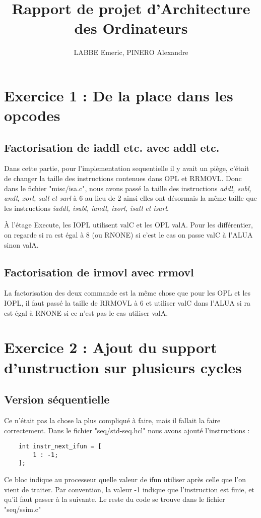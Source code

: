 \documentclass[12pt]{article}
\author{LABBE Emeric, PINERO Alexandre}
\title{Rapport de projet d'Architecture des Ordinateurs}
\begin{document}
\maketitle
\tableofcontents

\newpage
\section{Exercice 1 : De la place dans les opcodes}
\subsection{Factorisation de iaddl etc. avec addl etc.}
Dans cette partie, pour l'implementation sequentielle il y avait un piège, c'était de changer la taille des instructions contenues dans OPL et RRMOVL. Donc dans le fichier "misc/isa.c", nous avons passé la taille des instructions \emph{addl, subl, andl, xorl, sall et sarl} à 6 au lieu de 2 ainsi elles ont désormais la même taille que les instructions \emph{iaddl, isubl, iandl, ixorl, isall et isarl}.\par
\`A l'étage Execute, les IOPL utilisent valC et les OPL valA. Pour les différentier, on regarde si ra est égal à 8 (ou RNONE) si c'est le cas on passe valC à l'ALUA sinon valA.

\subsection{Factorisation de irmovl avec rrmovl}
La factorisation des deux commande est la même chose que pour les OPL et les IOPL, il faut passé la taille de RRMOVL à 6 et utiliser valC dans l'ALUA si ra est égal à RNONE si ce n'est pas le cas utiliser valA.

\section{Exercice 2 : Ajout du support d'unstruction sur plusieurs cycles}
\subsection{Version séquentielle}
Ce n'était pas la chose la plus compliqué à faire, mais il fallait la faire correctement. Dans le fichier "seq/std-seq.hcl" nous avons ajouté l'instructions :
\begin{verbatim}
	int instr_next_ifun = [
		1 : -1;
	];
\end{verbatim}
Ce bloc indique au processeur quelle valeur de ifun utiliser après celle que l’on vient de traiter.
Par convention, la valeur -1 indique que l’instruction est finie, et qu’il faut passer à la suivante.
Le reste du code se trouve dans le fichier "seq/ssim.c"
\end{document}
